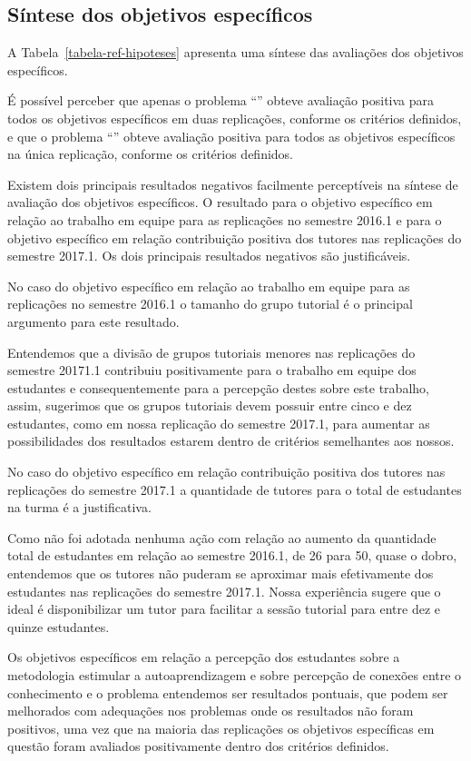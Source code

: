 \subsection{Síntese dos objetivos específicos}
A Tabela~\ref{tabela-ref-hipoteses} apresenta
uma síntese das avaliações dos objetivos específicos.


É possível perceber que apenas o problema ``\ProblemaD'' obteve
avaliação positiva para todos os objetivos específicos em duas
replicações, conforme os critérios definidos, e que o
problema ``\ProblemaA'' obteve avaliação positiva para todos as
objetivos específicos na única replicação, conforme os
critérios definidos.

Existem dois principais resultados negativos facilmente
perceptíveis na síntese de avaliação dos objetivos
específicos.
O resultado para o objetivo específico em relação ao trabalho em equipe
para as replicações no semestre 2016.1 e para o objetivo
específico em relação contribuição positiva dos tutores nas
replicações do semestre 2017.1.
Os dois principais resultados negativos são justificáveis.

No caso do objetivo específico em relação ao trabalho em equipe
para as replicações no semestre 2016.1 o tamanho
do grupo tutorial é o principal argumento
para este resultado.

Entendemos que a divisão de grupos tutoriais menores
nas replicações do semestre 20171.1 contribuiu
positivamente para o trabalho em equipe dos
estudantes e consequentemente para a percepção destes
sobre este trabalho, assim, sugerimos que os
grupos tutoriais devem possuir entre cinco e dez estudantes,
como em nossa replicação do semestre 2017.1, para aumentar
as possibilidades dos resultados estarem dentro de critérios
semelhantes aos nossos.

No caso do objetivo específico em relação contribuição positiva
dos tutores nas replicações do semestre 2017.1 a quantidade de
tutores para o total de estudantes na turma é a justificativa.

Como não foi adotada nenhuma ação com relação ao aumento da
quantidade total de estudantes em relação ao semestre 2016.1,
de 26 para 50, quase o dobro, entendemos que os tutores não
puderam se aproximar mais efetivamente dos estudantes
nas replicações do semestre 2017.1.
Nossa experiência sugere que o ideal é disponibilizar um
tutor para facilitar a sessão tutorial para entre dez e
quinze estudantes.

Os objetivos específicos em relação a percepção dos estudantes sobre
a metodologia estimular a autoaprendizagem e sobre percepção de
conexões entre o conhecimento e o problema entendemos ser
resultados pontuais, que podem ser melhorados com adequações nos problemas
onde os resultados não foram positivos, uma vez que na maioria das replicações
os objetivos específicas em questão foram avaliados positivamente
dentro dos critérios definidos.
